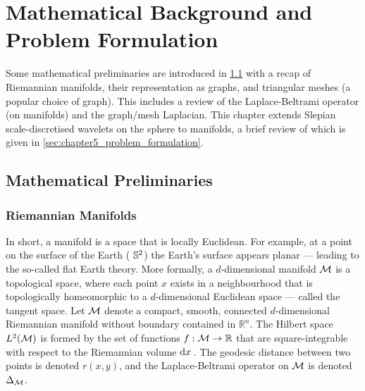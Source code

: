 \section{Mathematical Background and Problem Formulation}\label{sec:chapter5_mathematical_background_problem_formulation}

Some mathematical preliminaries are introduced in \cref{sec:chapter5_mathematical_preliminaries} with a recap of Riemannian manifolds, their representation as graphs, and triangular meshes (a popular choice of graph).
This includes a review of the Laplace-Beltrami operator (on manifolds) and the graph/mesh Laplacian.
This chapter extends Slepian scale-discretised wavelets on the sphere to manifolds, a brief review of which is given in \cref{sec:chapter5_problem_formulation}.

\subsection{Mathematical Preliminaries}\label{sec:chapter5_mathematical_preliminaries}

\subsubsection{Riemannian Manifolds}

In short, a manifold is a space that is locally Euclidean.
For example, at a point on the surface of the Earth (\ie{} \(\mathbb{S}^{2}{}\)) the Earth's surface appears planar --- leading to the so-called flat Earth theory.
More formally, a \(d\)-dimensional manifold \(\mathcal{M}{}\) is a topological space, where each point \(x\) exists in a neighbourhood that is topologically homeomorphic to a \(d\)-dimensional Euclidean space --- called the tangent space.
Let \(\mathcal{M}{}\) denote a compact, smooth, connected \(d\)-dimensional Riemannian manifold without boundary contained in \(\mathbb{R}^{n}\).
The Hilbert space \(L^{2}(\mathcal{M})\) is formed by the set of functions \(f : \mathcal{M} \to \mathbb{R}\) that are square-integrable with respect to the Riemannian volume \(\dd{x}{}\).
The geodesic distance between two points is denoted \(r(x,y)\), and the Laplace-Beltrami operator on \(\mathcal{M}{}\) is denoted \(\Delta_{\mathcal{M}}\).

